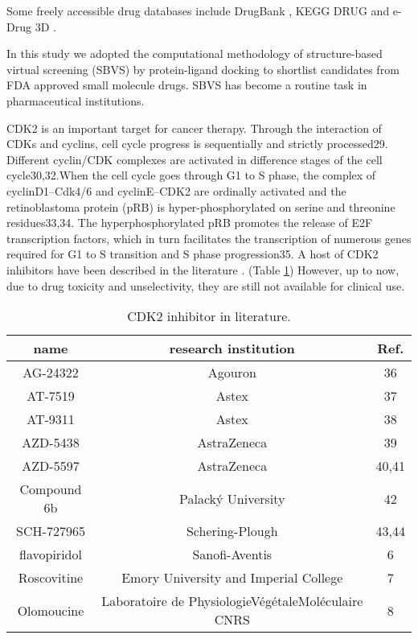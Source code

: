 Some freely accessible drug databases include DrugBank \citep{1594}, KEGG DRUG \citep{1595} and e-Drug 3D \citep{1125}.


In this study we adopted the computational methodology of structure-based virtual screening (SBVS) by protein-ligand docking to shortlist candidates from FDA approved small molecule drugs. SBVS has become a routine task in pharmaceutical institutions.

CDK2 is an important target for cancer therapy. Through the interaction of CDKs and cyclins, cell cycle progress is sequentially and strictly processed29. Different cyclin/CDK complexes are activated in difference stages of the cell cycle30,32.When the cell cycle goes through G1 to S phase, the complex of cyclinD1–Cdk4/6 and cyclinE–CDK2 are ordinally activated and the retinoblastoma protein (pRB) is hyper-phosphorylated on serine and threonine residues33,34. The hyperphosphorylated pRB promotes the release of E2F transcription factors, which in turn facilitates the transcription of numerous genes required for G1 to S transition and S phase progression35. A host of CDK2 inhibitors have been described in the literature . (Table \ref{cdk2:KnownInhibitors}) However, up to now, due to drug toxicity and unselectivity, they are still not available for clinical use.

\begin{table}
\caption{CDK2 inhibitor in literature.}
\label{cdk2:KnownInhibitors}
\begin{tabular}{ccc}
\hline
name & research institution & Ref.\\
\hline
AG-24322 & Agouron & 36\\
AT-7519 & Astex & 37\\
AT-9311 & Astex & 38\\
AZD-5438 & AstraZeneca & 39\\
AZD-5597 & AstraZeneca & 40,41\\
Compound 6b & Palacký University & 42\\
SCH-727965 & Schering-Plough & 43,44\\
flavopiridol & Sanofi-Aventis & 6\\
Roscovitine & Emory University and Imperial College & 7\\
Olomoucine & Laboratoire de PhysiologieVégétaleMoléculaire CNRS & 8\\
\hline
\end{tabular}
\end{table}

